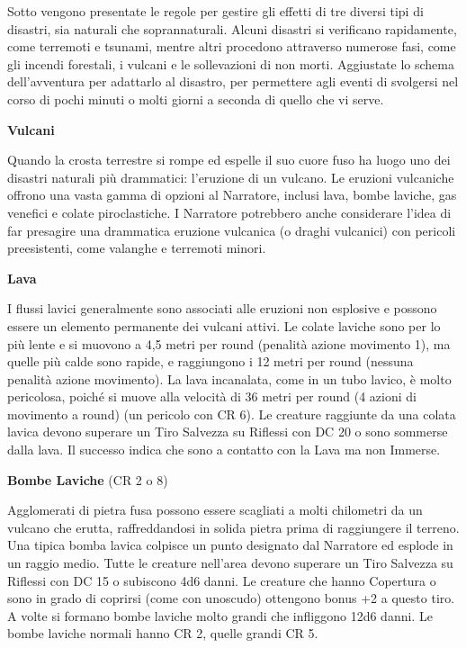 \documentclass[a4paper,11pt,twoside,openany]{book}
\begin{document}
Sotto vengono presentate le regole per gestire gli effetti di tre diversi tipi di disastri, sia naturali che soprannaturali. Alcuni disastri si verificano rapidamente, come terremoti e tsunami, mentre altri procedono attraverso numerose fasi, come gli incendi forestali, i vulcani e le sollevazioni di non morti. Aggiustate lo schema dell'avventura per adattarlo al disastro, per permettere agli eventi di svolgersi nel corso di pochi minuti o molti giorni a seconda di quello che vi serve.

\textbf{Vulcani}

Quando la crosta terrestre si rompe ed espelle il suo cuore fuso ha luogo uno dei disastri naturali più drammatici: l'eruzione di un vulcano. Le eruzioni vulcaniche offrono una vasta gamma di opzioni al Narratore, inclusi lava, bombe laviche, gas venefici e colate piroclastiche. I Narratore potrebbero anche considerare l'idea di far presagire una drammatica eruzione vulcanica (o draghi vulcanici) con pericoli preesistenti, come valanghe e terremoti minori.

\textbf{Lava}

I flussi lavici generalmente sono associati alle eruzioni non esplosive e possono essere un elemento permanente dei vulcani attivi. Le colate laviche sono per lo più lente e si muovono a 4,5 metri per round (penalità azione movimento 1), ma quelle più calde sono rapide, e raggiungono i 12 metri per round (nessuna penalità azione movimento). La lava incanalata, come in un tubo lavico, è molto pericolosa, poiché si muove alla velocità di 36 metri per round (4 azioni di movimento a round) (un pericolo con CR 6). Le creature raggiunte da una colata lavica devono superare un Tiro Salvezza su Riflessi con DC 20 o sono sommerse dalla lava. Il successo indica che sono a contatto con la Lava ma non Immerse.

\textbf{Bombe Laviche} (CR 2 o 8)

Agglomerati di pietra fusa possono essere scagliati a molti chilometri da un vulcano che erutta, raffreddandosi in solida pietra prima di raggiungere il terreno. Una tipica bomba lavica colpisce un punto designato dal Narratore ed esplode in un raggio medio. Tutte le creature nell'area devono superare un Tiro Salvezza su Riflessi con DC 15 o subiscono 4d6 danni. Le creature che hanno Copertura o sono in grado di coprirsi (come con uno­scudo) ottengono bonus +2 a questo tiro. A volte si formano bombe laviche molto grandi che infliggono 12d6 danni. Le bombe laviche normali hanno CR 2, quelle grandi CR 5.
\end{document}
